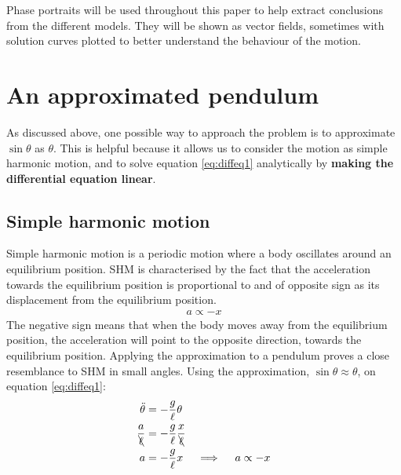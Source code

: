 \documentclass[12pt, a4paper, titlepage]{article}
\theoremstyle{definition}
\numberwithin{equation}{section}
\theoremstyle{definition}
\theoremstyle{definition}
\begin{document}
Phase portraits will be used throughout this paper to help extract conclusions from the different models. They will be shown as vector fields, sometimes with solution curves plotted to better understand the behaviour of the motion.

\section{An approximated pendulum}\label{approx_pendulum}
As discussed above, one possible way to approach the problem is to approximate $\sin\theta$ as $\theta$. This is helpful because it allows us to consider the motion as simple harmonic motion, and to solve equation \eqref{eq:diffeq1} analytically by \textbf{making the differential equation linear}.

\subsection{Simple harmonic motion}
Simple harmonic motion is a periodic motion where a body oscillates around an equilibrium position. SHM is characterised by the fact that the acceleration towards the equilibrium position is proportional to and of opposite sign as its displacement from the equilibrium position.
\begin{align}
a\propto-x\label{eq:apx}
\end{align}
The negative sign means that when the body moves away from the equilibrium position, the acceleration will point to the opposite direction, towards the equilibrium position. \parencite[p. 151]{hamper} Applying the approximation to a pendulum proves a close resemblance to SHM in small angles. Using the approximation, $\sin\theta\approx\theta$, on equation \eqref{eq:diffeq1}:
\begin{align}
\ddot{\theta}&=-\frac{g}{\ell}\theta\\
\frac{a}{\bcancel{\ell}}&=-\frac{g}{\ell} \frac{x}{\bcancel{\ell}}\\
a&=-\frac{g}{\ell}x\quad\implies\quad a\propto-x\label{eq:aglx}
\end{align}
\end{document}
